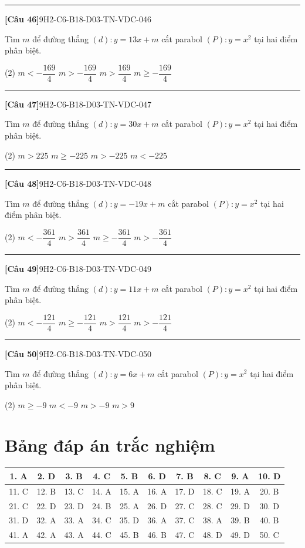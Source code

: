 \documentclass[12pt,a4paper]{article}
\newif\ifloigiai
\newenvironment{cauhoi}[2]{%
  \par\medskip\noindent\rule{\textwidth}{0.4pt}\par\nopagebreak
  \noindent\textbf{[#1]}\hfill{\scriptsize\ttfamily #2}\par\nopagebreak\smallskip}{\par}
\newcommand{\dapan}[1]{\ifloigiai\par\smallskip\noindent\textit{Đáp án:} \textbf{#1}\par\fi}
\begin{document}
\begin{cauhoi}{Câu 46}{9H2-C6-B18-D03-TN-VDC-046}
Tìm $m$ để đường thẳng $(d): y=13x+m$ cắt parabol $(P): y=x^{2}$ tại hai điểm phân biệt.
\begin{tasks}(2)
\task $m<-\dfrac{169}{4}$
\task $m>-\dfrac{169}{4}$
\task $m>\dfrac{169}{4}$
\task $m\ge -\dfrac{169}{4}$
\end{tasks}
\dapan{B}
\end{cauhoi}
\begin{cauhoi}{Câu 47}{9H2-C6-B18-D03-TN-VDC-047}
Tìm $m$ để đường thẳng $(d): y=30x+m$ cắt parabol $(P): y=x^{2}$ tại hai điểm phân biệt.
\begin{tasks}(2)
\task $m>225$
\task $m\ge -225$
\task $m>-225$
\task $m<-225$
\end{tasks}
\dapan{C}
\end{cauhoi}
\begin{cauhoi}{Câu 48}{9H2-C6-B18-D03-TN-VDC-048}
Tìm $m$ để đường thẳng $(d): y=-19x+m$ cắt parabol $(P): y=x^{2}$ tại hai điểm phân biệt.
\begin{tasks}(2)
\task $m<-\dfrac{361}{4}$
\task $m>\dfrac{361}{4}$
\task $m\ge -\dfrac{361}{4}$
\task $m>-\dfrac{361}{4}$
\end{tasks}
\dapan{D}
\end{cauhoi}
\begin{cauhoi}{Câu 49}{9H2-C6-B18-D03-TN-VDC-049}
Tìm $m$ để đường thẳng $(d): y=11x+m$ cắt parabol $(P): y=x^{2}$ tại hai điểm phân biệt.
\begin{tasks}(2)
\task $m<-\dfrac{121}{4}$
\task $m\ge -\dfrac{121}{4}$
\task $m>\dfrac{121}{4}$
\task $m>-\dfrac{121}{4}$
\end{tasks}
\dapan{D}
\end{cauhoi}
\begin{cauhoi}{Câu 50}{9H2-C6-B18-D03-TN-VDC-050}
Tìm $m$ để đường thẳng $(d): y=6x+m$ cắt parabol $(P): y=x^{2}$ tại hai điểm phân biệt.
\begin{tasks}(2)
\task $m\ge -9$
\task $m<-9$
\task $m>-9$
\task $m>9$
\end{tasks}
\dapan{C}
\end{cauhoi}
\clearpage\section*{Bảng đáp án trắc nghiệm}
\begin{center}\begin{tabular}{|c|c|c|c|c|c|c|c|c|c|}
\hline
1. A & 2. D & 3. B & 4. C & 5. B & 6. D & 7. B & 8. C & 9. A & 10. D\\\hline
11. C & 12. B & 13. C & 14. A & 15. A & 16. A & 17. D & 18. C & 19. A & 20. B\\\hline
21. C & 22. D & 23. D & 24. B & 25. A & 26. D & 27. C & 28. C & 29. D & 30. D\\\hline
31. D & 32. A & 33. A & 34. C & 35. D & 36. A & 37. C & 38. A & 39. B & 40. B\\\hline
41. A & 42. A & 43. A & 44. C & 45. B & 46. B & 47. C & 48. D & 49. D & 50. C\\\hline
\end{tabular}\end{center}
\end{document}
